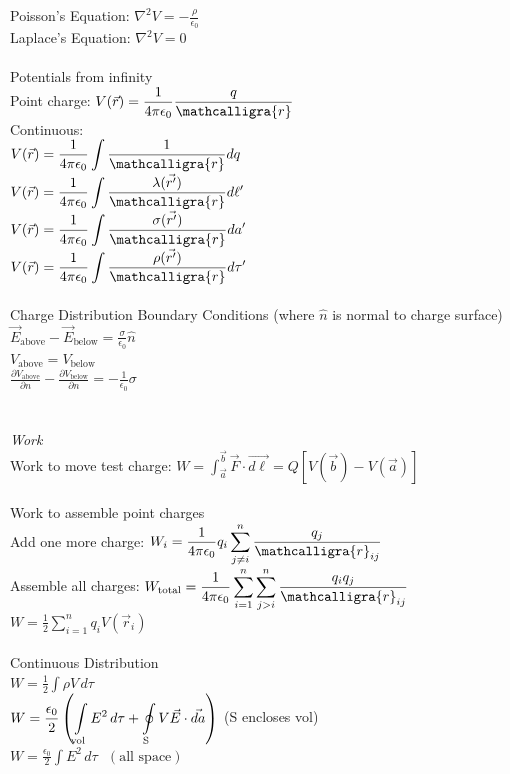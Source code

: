 \documentclass[12pt]{article}
\newcommand{\ds}{\displaystyle}
\newcommand{\scripty}[1]{\ensuremath{\mathcalligra{#1}}}
\begin{document}
\begin{flushleft}
Poisson's Equation: $\ds\nabla^2V=-\frac{\rho}{\epsilon_0}$\\
Laplace's Equation: $\ds\nabla^2V=0$\\~\\

Potentials from infinity\\
Point charge: $\ds V(\vec{r})=\frac{1}{4\pi\epsilon_0}\frac{q}{\scripty{r}}$\\
Continuous:\\
$\ds V(\vec{r})=\frac{1}{4\pi\epsilon_0}\int\frac{1}{\scripty{r}}dq$\\
$\ds V(\vec{r})=\frac{1}{4\pi\epsilon_0}\int\frac{\lambda(\vec{r'})}{\scripty{r}}d\ell'$\\
$\ds V(\vec{r})=\frac{1}{4\pi\epsilon_0}\int\frac{\sigma(\vec{r'})}{\scripty{r}}da'$\\
$\ds V(\vec{r})=\frac{1}{4\pi\epsilon_0}\int\frac{\rho(\vec{r'})}{\scripty{r}}d\tau'$\\~\\

Charge Distribution Boundary Conditions (where $\hat{n}$ is normal to charge surface)\\
$\ds\vec{E}_{\text{above}}-\vec{E}_{\text{below}}=\frac{\sigma}{\epsilon_0}\hat{n}$\\
$\ds V_{\text{above}}=V_{\text{below}}$\\
$\ds \frac{\partial V_{\text{above}}}{\partial n}-\frac{\partial V_{\text{below}}}{\partial n}=-\frac{1}{\epsilon_0}\sigma$\\~\\~\\

\textit{Work}\\
Work to move test charge: $\ds W=\int_{\vec{a}}^{\vec{b}}\vec{F}\cdot\vec{d\ell}=Q[V(\vec{b})-V(\vec{a})]$\\~\\
Work to assemble point charges\\
Add one more charge: $\ds W_i=\frac{1}{4\pi\epsilon_0}q_i\sum_{j\neq i}^n\frac{q_j}{\scripty{r}_{ij}}$\\
Assemble all charges: $\ds W_{\text{total}}=\frac{1}{4\pi\epsilon_0}\sum_{i=1}^n\sum_{j>i}^n\frac{q_iq_j}{\scripty{r}_{ij}}$\\
$\ds W=\frac{1}{2}\sum_{i=1}^nq_iV(\vec{r}_i)$\\~\\

Continuous Distribution\\
$\ds W=\frac{1}{2}\int\rho V\,d\tau$\\
$\ds W=\frac{\epsilon_0}{2}\left(\int\displaylimits_{\text{vol}}E^2\,d\tau+\oint\displaylimits_{\text{S}}V\vec{E}\cdot\vec{da}\right)$ (S encloses vol)\\
$\ds W=\frac{\epsilon_0}{2}\int E^2\,d\tau\ \ \ (\text{all space})$\\~\\~\\



\end{flushleft}
\end{document}
